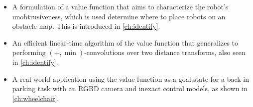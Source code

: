 \begin{itemize}
\item A formulation of a value function that aims to characterize the robot's
unobtrusiveness, which is used determine where to place robots on an obstacle
map.  This is introduced in \autoref{ch:identify}.
\item An efficient linear-time algorithm of the value function that generalizes to
performing $(+,\min)$-convolutions over two distance transforms, also seen in \autoref{ch:identify}.
\item A real-world application using the value function as a goal state for a
back-in parking task with an RGBD camera and inexact control models,
as shown in \autoref{ch:wheelchair}.
\end{itemize}



\endinput
Any text after an \endinput is ignored.

\section{Summary of Thesis}
\subsection{One sentence summary}
We introduce an autonomous back-in parking system for powered wheelchairs
equipped with an RGB-D sensor, that finds a suitable place to park in a room
without any marked parking spots.

\subsection{One paragraph summary}
We address the problem: Where

\subsection{Five minute read summary}

\paragraph{What is this?} A collection of research ideas.

\paragraph{Who's it for?} Me.

